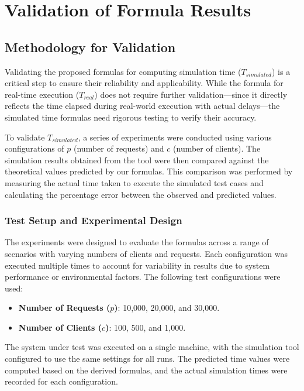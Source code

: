 \chapter{Validation of Formula Results}

\section{Methodology for Validation}

Validating the proposed formulas for computing simulation time (\( T_{simulated} \)) is a critical step to ensure their reliability and applicability. While the formula for real-time execution (\( T_{real} \)) does not require further validation—since it directly reflects the time elapsed during real-world execution with actual delays—the simulated time formulas need rigorous testing to verify their accuracy.

To validate \( T_{simulated} \), a series of experiments were conducted using various configurations of \( p \) (number of requests) and \( c \) (number of clients). The simulation results obtained from the tool were then compared against the theoretical values predicted by our formulas. This comparison was performed by measuring the actual time taken to execute the simulated test cases and calculating the percentage error between the observed and predicted values.

\subsection{Test Setup and Experimental Design}

The experiments were designed to evaluate the formulas across a range of scenarios with varying numbers of clients and requests. Each configuration was executed multiple times to account for variability in results due to system performance or environmental factors. The following test configurations were used:

\begin{itemize}
    \item \textbf{Number of Requests (\( p \))}: 10,000, 20,000, and 30,000.
    \item \textbf{Number of Clients (\( c \))}: 100, 500, and 1,000.
\end{itemize}

The system under test was executed on a single machine, with the simulation tool configured to use the same settings for all runs. The predicted time values were computed based on the derived formulas, and the actual simulation times were recorded for each configuration.

